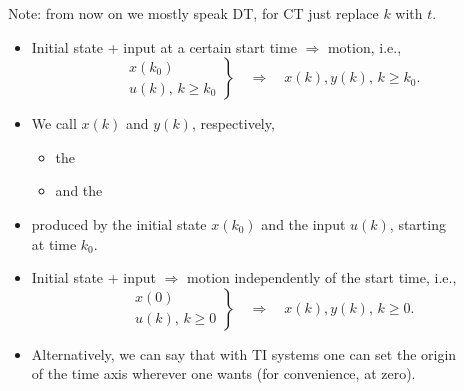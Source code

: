 \begin{frame}
\myPause
\centerline{Note: from now on we mostly speak DT, for CT just replace $k$ with $t$.} \myPause
\vspace{3mm}\begin{itemize}[<+-| alert@+>]
\item Initial state + input at a certain start time $\Rightarrow$ motion, i.e.,
      \begin{displaymath}
       \left.
        \begin{array}{l}
         x(k_0) \\ u(k),\,k \geq k_0
        \end{array}
       \right\}
       \quad \Rightarrow \quad
        x(k),y(k),\,k \geq k_0.
      \end{displaymath}
\item We call $x(k)$ and $y(k)$, respectively,
      \begin{itemize}[<+-| alert@+>]
      \item the 
      \item and the 
      \end{itemize}
\item [] produced by the initial state $x(k_0)$ and the input $u(k)$, starting\\
      at time $k_0$.
\end{itemize}
\end{frame}

\begin{frame}
\myPause
\begin{itemize}[<+-| alert@+>]
\item Initial state + input $\Rightarrow$ motion independently of the start time, i.e.,
      \begin{displaymath}
       \left.
        \begin{array}{l}
         x(0) \\ u(k),\,k \geq 0
        \end{array}
       \right\}
       \quad \Rightarrow \quad
        x(k),y(k),\,k \geq 0.
      \end{displaymath}
\item Alternatively, we can say that with TI systems one can set the origin\\
      of the time axis wherever one wants (for convenience, at zero).
\end{itemize}
\end{frame}


